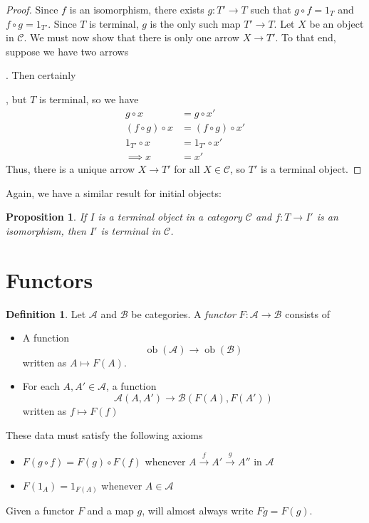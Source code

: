 \documentclass[10pt,oneside]{book}
\def\~#1{\mathscr{#1}}
\def\To#1{\xrightarrow{#1}}
\newcommand{\ob}{\mathop{\mathrm{ob}}}
\theoremstyle{plain}
\newtheorem{prop}[thm]{Proposition}
\theoremstyle{definition}
\newtheorem{defn}[thm]{Definition}
\theoremstyle{remark}
\numberwithin{equation}{section}
\numberwithin{figure}{section}
\begin{document}
\begin{proof}
    Since $f$ is an isomorphism, there exists $g: T' \to T$ such that $g \circ f = 1_T$ and $f \circ g = 1_{T'}$. Since $T$ is terminal, $g$ is the only such map $T' \to T$. Let $X$ be an object in $\~C$. We must now show that there is only one arrow $X \to T'$. To that end, suppose we have two arrows. Then certainly , but $T$ is terminal, so we have 
    \begin{align*}
        g \circ x &= g \circ x' \\
        (f \circ g) \circ x &= (f \circ g) \circ x' \\
        1_{T'} \circ x &= 1_{T'} \circ x'\\
        \implies x &= x'
    \end{align*}
    Thus, there is a unique arrow $X \to T'$ for all $X \in \~C$, so $T'$ is a terminal object.
\end{proof}

Again, we have a similar result for initial objects:

\begin{prop}
    If $I$ is a terminal object in a category $\~C$ and $f: T \to I'$ is an isomorphism, then $I'$ is terminal in $\~C$.
\end{prop}


\section{Functors}

\begin{defn}
    Let $\~A$ and $\~B$ be categories. A \emph{functor} $F: \~A \to \~B$ consists of
    \begin{itemize}
        \item A function
        \[\ob(\~A) \to \ob(\~B)\]
        written as $A \mapsto F(A)$.

        \item For each $A, A' \in \~A$, a function 
        \[\~A(A, A') \to \~B(F(A), F(A'))\]
        written as $f \mapsto F(f)$
    \end{itemize}
    These data must satisfy the following axioms
    \begin{itemize}
        \item $F(g \circ f) = F(g) \circ F(f)$ whenever $A \To{f} A' \To{g} A''$ in $\~A$
        \item $F(1_A) = 1_{F(A)}$ whenever $A \in \~A$
    \end{itemize}
\end{defn}
Given a functor $F$ and a map $g$, will almost always write $Fg = F(g)$.
\end{document}
